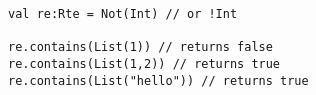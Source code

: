 \begin{lstlisting}[style=reclojureScala]
val re:Rte = Not(Int) // or !Int

re.contains(List(1)) // returns false
re.contains(List(1,2)) // returns true
re.contains(List("hello")) // returns true
\end{lstlisting}
